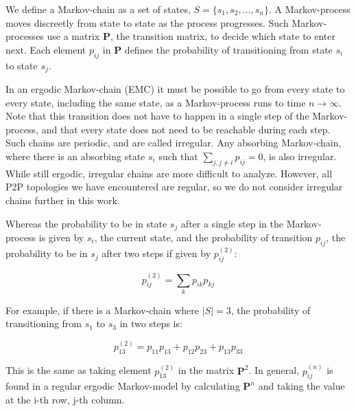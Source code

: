 \documentclass[a4paper,11pt,twocolumn]{article}
\begin{document}
We define a Markov-chain as a set of states, $S = \{s_1, s_2, \ldots, s_n\}$.  A
Markov-process moves discreetly from state to state as the process
progresses.  Such Markov-processes use a matrix $\textbf{P}$, the transition
matrix, to decide which state to enter next.  Each element $p_{ij}$ in
$\textbf{P}$ defines the probability of transitioning from state $s_i$ to state $s_j$.

In an ergodic Markov-chain (EMC) it must be possible to go from every state to every
state, including the same state, as a Markov-process runs to time $n \rightarrow
\infty$.  Note that this transition does not have to
happen in a single step of the Markov-process, and that every state does not
need to be reachable during each step.  Such chains are periodic, and are
called irregular.  Any absorbing Markov-chain, where
there is an absorbing state $s_i$ such that $\sum_{j, j \ne i}{p_{ij}} = 0$, is
also irregular.  While still ergodic, irregular chains are more difficult to
analyze.  However, all P2P topologies we have encountered are regular, so we do
not consider irregular chains further in this work.

Whereas the probability to be in state $s_j$ after a single step in the
Markov-process is given by $s_i$, the current state, and the probability of
transition $p_{ij}$, the probability to be in $s_j$ after two steps if given by
$p_{ij}^{(2)}$:

\begin{equation}
	p_{ij}^{(2)} = \sum_{k}{p_{ik}p_{kj}}
\end{equation}

For example, if there is a Markov-chain where $|S| = 3$, the probability of
transitioning from $s_1$ to $s_3$ in two steps is:

\begin{equation}
	p_{13}^{(2)} = p_{11}p_{13} + p_{12}p_{23} + p_{13}p_{33}
\end{equation}

This is the same as taking element $p_{13}^{(2)}$ in the matrix
$\textbf{P}^2$.  In general, $p_{ij}^{(n)}$ is found in a regular ergodic
Markov-model by calculating $\textbf{P}^n$ and taking the value at the i-th
row, j-th column.
\end{document}
